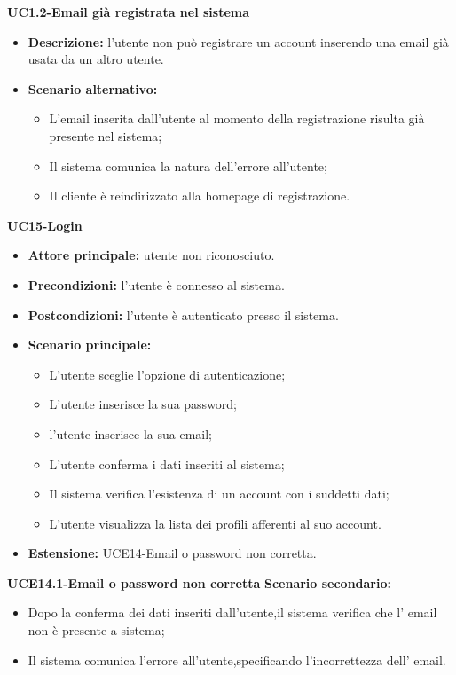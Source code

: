 \textbf{UC1.2-Email già registrata nel sistema}
\begin{itemize}
    \item \textbf{Descrizione: }l'utente non può registrare un account inserendo una email già usata da un altro utente.
    \item \textbf{Scenario alternativo:}
    \begin{itemize}
        \item L'email inserita dall'utente al momento della registrazione risulta già presente nel sistema;
        \item Il sistema comunica la natura dell'errore all'utente;
        \item Il cliente è reindirizzato alla homepage di registrazione.
    \end{itemize}
\end{itemize}
\break

\textbf{UC15-Login}
\begin{itemize}
\item \textbf{Attore principale:} utente non riconosciuto.
\item \textbf{Precondizioni:} l'utente è connesso al sistema.
\item \textbf{Postcondizioni:} l'utente è autenticato presso il sistema.
\item \textbf{Scenario principale:}
\begin{itemize}
    \item L'utente sceglie l'opzione di autenticazione;
    \item L'utente inserisce la sua password;
    \item l'utente inserisce la sua email;
    \item L'utente conferma i dati inseriti al sistema;
    \item Il sistema verifica l'esistenza di un account con i suddetti dati;
    \item L'utente visualizza la lista dei profili afferenti al suo account.
\end{itemize}
    \item \textbf{Estensione: }UCE14-Email o password non corretta.
\end{itemize}

\textbf{UCE14.1-Email o password non corretta}
\textbf{Scenario secondario:}
\begin{itemize}
    \item Dopo la conferma dei dati inseriti dall'utente,il sistema verifica 
    che l' email non è presente a sistema;
    \item Il sistema comunica l'errore all'utente,specificando l'incorrettezza dell'
    email.
\end{itemize}

